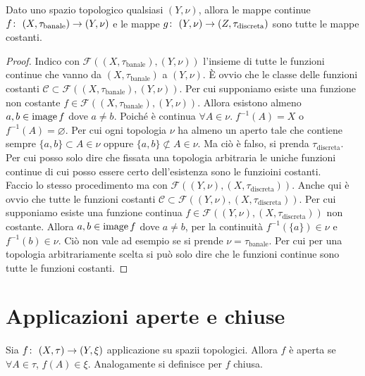 \begin{theorem}
	Dato uno spazio topologico qualsiasi $(Y,\nu)$, allora le mappe continue $f \colon\ (X,\tau_{\text{banale}}) \rightarrow (Y,\nu)$ e le mappe $g \colon\ (Y,\nu) \rightarrow (Z,\tau_{\text{discreta}})$ sono tutte le mappe costanti.
\end{theorem}
\begin{proof}
	Indico con $\mathcal{F}((X,\tau_{\text{banale}}),(Y,\nu))$ l'insieme di tutte le funzioni continue che vanno da $(X,\tau_{\text{banale}})$ a $(Y,\nu)$. È ovvio che le classe delle funzioni costanti $\mathcal{C} \subset \mathcal{F}((X,\tau_{\text{banale}}),(Y,\nu))$. Per cui supponiamo esiste una funzione non costante $f \in \mathcal{F}((X,\tau_{\text{banale}}),(Y,\nu))$. Allora esistono almeno $a,b \in \operatorname{image}{f}$ dove $a \neq b$. Poiché è continua $\forall A \in \nu . \; f^{-1}(A) = X$ o $f^{-1}(A) = \varnothing$. Per cui ogni topologia $\nu$ ha almeno un aperto tale che contiene sempre $\{a,b\} \subset A \in \nu$ oppure $\{a,b\} \not\subset A \in \nu$. Ma ciò è falso, si prenda $\tau_{\text{discreta}}$. Per cui posso solo dire che fissata una topologia arbitraria le uniche funzioni continue di cui posso essere certo dell'esistenza sono le funzioini costanti. \\
	
	Faccio lo stesso procedimento ma con $\mathcal{F}((Y,\nu), (X,\tau_{\text{discreta}}))$. Anche qui è ovvio che tutte le funzioni costanti $\mathcal{C} \subset \mathcal{F}((Y,\nu), (X,\tau_{\text{discreta}}))$. Per cui supponiamo esiste una funzione continua $f \in \mathcal{F}((Y,\nu), (X,\tau_{\text{discreta}}))$ non costante. Allora $a,b \in \operatorname{image}{f}$ dove $a \neq b$, per la continuità $f^{-1}(\{a\}) \in \nu $ e $f^{-1}(b) \in \nu$. Ciò non vale ad esempio se si prende $\nu = \tau_{\text{banale}}$. Per cui per una topologia arbitrariamente scelta si può solo dire che le funzioni continue sono tutte le funzioni costanti.
\end{proof}

\section{Applicazioni aperte e chiuse}
\begin{definition}
	Sia $f \colon\ (X,\tau) \rightarrow (Y,\xi)$ applicazione su spazii topologici. Allora $f$ è aperta se $\forall A \in \tau$, $f(A) \in \xi$. Analogamente si definisce per $f$ chiusa.
\end{definition}

